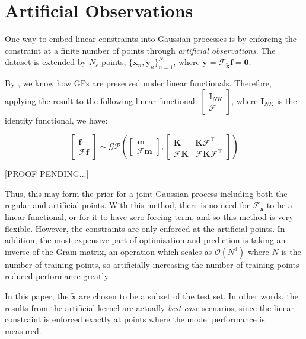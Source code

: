 \documentclass[12pt,a4paper,twoside]{report}
\theoremstyle{definition}
\newcommand{\f}{\mathscr F_\mathbf x}
\begin{document}
\section{Artificial Observations}
One way to embed linear constraints into Gaussian processes is by enforcing the constraint at a finite number of points through \emph{artificial observations}. The dataset is extended by $N_c$ points, $\{ \mathbf{ \tilde x}_n,  \mathbf{ \tilde y}_n\}_{n=1}^{N_c}$, where $\mathbf{ \tilde y} = \mathscr F_{\mathbf{\tilde{x}}} \mathbf f = \mathbf 0$. 

By , we know how GPs are preserved under linear functionals. Therefore, applying the result to the following linear functional: $\begin{bmatrix} \mathbf I_{NK}\\\mathscr F \end{bmatrix}$, where $\mathbf I_{NK}$ is the identity functional, we have:

$$\begin{bmatrix} \mathbf f\\\mathscr F \mathbf f \end{bmatrix}\sim \mathcal {GP}\left( \begin{bmatrix} \mathbf m\\ \mathscr F \mathbf m \end{bmatrix}, \begin{bmatrix} \mathbf  K & \mathbf K \mathscr{F}^\top \\ \mathscr F \mathbf K & \mathscr F \mathbf K \mathscr{F}^\top \end{bmatrix}  \right)  $$

[PROOF PENDING...]

Thus, this may form the prior for a joint Gaussian process including both the regular and artificial points. With this method, there is no need for $\f$ to be a linear functional, or for it to have zero forcing term, and so this method is very flexible. However, the constraints are only enforced at the artificial points. In addition, the most expensive part of optimisation and prediction is taking an inverse of the Gram matrix, an operation which scales as $\mathcal O(N^3)$ where $N$ is the number of training points, so artificially increasing the number of training points reduced performance greatly.

In this paper, the $\mathbf {\tilde{x}}$ are chosen to be a subset of the test set. In other words, the results from the artificial kernel are actually \emph{best case} scenarios, since the linear constraint is enforced exactly at points where the model performance is measured.
\end{document}
